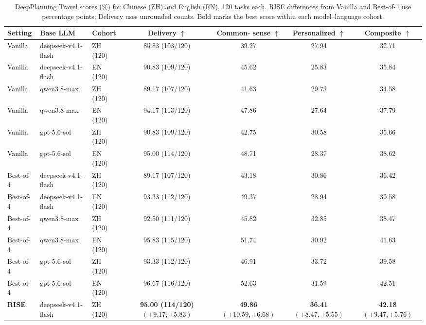 \documentclass{article}
\begin{document}
\begin{table}[!htb]
\centering
\scriptsize
\setlength{\tabcolsep}{1.6pt}
\renewcommand{\arraystretch}{1.12}
\caption{DeepPlanning Travel scores (\%) for Chinese (ZH) and English (EN), 120 tasks each. RISE differences from Vanilla and Best-of-4 use percentage points; Delivery uses unrounded counts. Bold marks the best score within each model--language cohort.}
\label{tab:deepplanning-models}
\begin{tabular*}{\linewidth}{@{\extracolsep{\fill}}lllcccc@{}}
\toprule
Setting & Base LLM & Cohort & \shortstack{Delivery\\$\uparrow$} & \shortstack{Common-\\sense $\uparrow$} & \shortstack{Personalized\\$\uparrow$} & \shortstack{Composite\\$\uparrow$} \\
\midrule
Vanilla & deepseek-v4.1-flash & ZH (120) & 85.83 (103/120) & 39.27 & 27.94 & 32.71 \\
Vanilla & deepseek-v4.1-flash & EN (120) & 90.83 (109/120) & 45.62 & 25.83 & 35.84 \\
Vanilla & qwen3.8-max & ZH (120) & 89.17 (107/120) & 41.63 & 29.73 & 34.58 \\
Vanilla & qwen3.8-max & EN (120) & 94.17 (113/120) & 47.86 & 27.64 & 37.79 \\
Vanilla & gpt-5.6-sol & ZH (120) & 90.83 (109/120) & 42.75 & 30.58 & 35.66 \\
Vanilla & gpt-5.6-sol & EN (120) & 95.00 (114/120) & 48.71 & 28.37 & 38.62 \\
\midrule
Best-of-4 & deepseek-v4.1-flash & ZH (120) & 89.17 (107/120) & 43.18 & 30.86 & 36.42 \\
Best-of-4 & deepseek-v4.1-flash & EN (120) & 93.33 (112/120) & 49.37 & 28.94 & 39.58 \\
Best-of-4 & qwen3.8-max & ZH (120) & 92.50 (111/120) & 45.82 & 32.85 & 38.47 \\
Best-of-4 & qwen3.8-max & EN (120) & 95.83 (115/120) & 51.74 & 30.92 & 41.63 \\
Best-of-4 & gpt-5.6-sol & ZH (120) & 93.33 (112/120) & 46.91 & 33.72 & 39.58 \\
Best-of-4 & gpt-5.6-sol & EN (120) & 96.67 (116/120) & 52.63 & 31.59 & 42.51 \\
\midrule
\textbf{RISE} & deepseek-v4.1-flash & ZH (120) & \shortstack[c]{\textbf{95.00 (114/120)}\\[-1pt]{\scriptsize $(+9.17,+5.83)$}} & \shortstack[c]{\textbf{49.86}\\[-1pt]{\scriptsize $(+10.59,+6.68)$}} & \shortstack[c]{\textbf{36.41}\\[-1pt]{\scriptsize $(+8.47,+5.55)$}} & \shortstack[c]{\textbf{42.18}\\[-1pt]{\scriptsize $(+9.47,+5.76)$}} \\

\end{tabular*}
\end{table}
\end{document}
